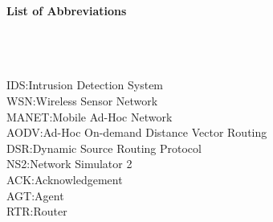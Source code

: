\begin{huge}
\textbf{List of Abbreviations}
\end{huge}
\\
\\
\\
IDS:\hspace*{0.65in}Intrusion Detection System\\
WSN:\hspace*{0.55in}Wireless Sensor Network\\
MANET:\hspace*{0.35in}Mobile Ad-Hoc Network\\
AODV:\hspace*{0.5in}Ad-Hoc On-demand Distance Vector Routing\\
DSR:\hspace*{0.6in}Dynamic Source Routing Protocol\\
NS2:\hspace*{0.7in}Network Simulator 2\\
ACK:\hspace*{0.6in}Acknowledgement\\
AGT:\hspace*{0.6in}Agent\\
RTR:\hspace*{0.6in}Router\\



